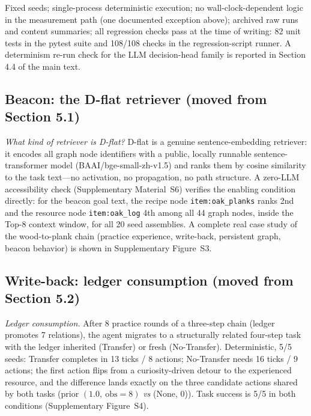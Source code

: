 \documentclass[10pt]{article}
\begin{document}
Fixed seeds; single-process deterministic execution; no wall-clock-dependent logic in the measurement path (one documented exception above); archived raw runs and content summaries; all regression checks pass at the time of writing: 82 unit tests in the pytest suite and 108/108 checks in the regression-script runner. A determinism re-run check for the LLM decision-head family is reported in Section 4.4 of the main text.

\subsection{Beacon: the D-flat retriever (moved from Section 5.1)}
\emph{What kind of retriever is D-flat?} D-flat is a genuine sentence-embedding retriever: it encodes all graph node identifiers with a public, locally runnable sentence-transformer model (BAAI/bge-small-zh-v1.5) and ranks them by cosine similarity to the task text---no activation, no propagation, no path structure. A zero-LLM accessibility check (Supplementary Material~S6) verifies the enabling condition directly: for the beacon goal text, the recipe node \texttt{item:oak\_planks} ranks 2nd and the resource node \texttt{item:oak\_log} 4th among all 44 graph nodes, inside the Top-8 context window, for all 20 seed assemblies. A complete real case study of the wood-to-plank chain (practice experience, write-back, persistent graph, beacon behavior) is shown in Supplementary Figure~S3.


\subsection{Write-back: ledger consumption (moved from Section 5.2)}
\emph{Ledger consumption.} After 8 practice rounds of a three-step chain (ledger promotes 7 relations), the agent migrates to a structurally related four-step task with the ledger inherited (Transfer) or fresh (No-Transfer). Deterministic, 5/5 seeds: Transfer completes in 13 ticks / 8 actions; No-Transfer needs 16 ticks / 9 actions; the first action flips from a curiosity-driven detour to the experienced resource, and the difference lands exactly on the three candidate actions shared by both tasks (prior $(1.0,\ \text{obs}{=}8)$ \emph{vs} (None, 0)). Task success is 5/5 in both conditions (Supplementary Figure~S4).
\end{document}
